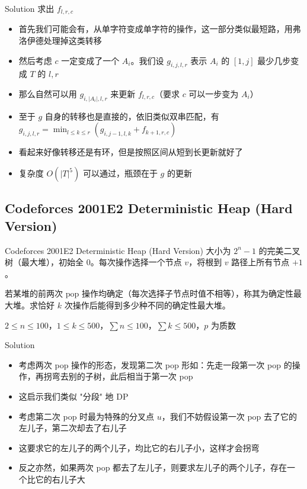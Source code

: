 ﻿\documentclass[aspectratio=169]{ctexbeamer}
\begin{document}
\begin{frame}{Solution}
    求出 $f_{l,r,c}$
    \begin{itemize}
        \item 首先我们可能会有，从单字符变成单字符的操作，这一部分类似最短路，用弗洛伊德处理掉这类转移
        \item 然后考虑 $c$ 一定变成了一个 $A_i$。我们设 $g_{i,j,l,r}$ 表示 $A_i$ 的 $[1,j]$ 最少几步变成 $T$ 的 ${l,r}$
        \item 那么自然可以用 $g_{i,|A_i|,l,r}$ 来更新 $f_{l,r,c}$（要求 $c$ 可以一步变为 $A_i$）
        \item 至于 $g$ 自身的转移也是直接的，依旧类似双串匹配，有 $g_{i,j,l,r}=\min_{l\le k\le r}(g_{i,j-1,l,k}+f_{k+1,r,c})$
        \item 看起来好像转移还是有环，但是按照区间从短到长更新就好了
        \item 复杂度 $O(|T|^5)$ 可以通过，瓶颈在于 $g$ 的更新
    \end{itemize}
\end{frame}


\subsection{Codeforces 2001E2 Deterministic Heap (Hard Version)}

\begin{frame}{Codeforces 2001E2 Deterministic Heap (Hard Version)}
      大小为 $2^n-1$ 的完美二叉树（最大堆），初始全 $0$。每次操作选择一个节点 $v$，将根到 $v$ 路径上所有节点 $+1$。
      
      若某堆的前两次 $\mathrm{pop}$ 操作均确定（每次选择子节点时值不相等），称其为确定性最大堆。求恰好 $k$ 次操作后能得到多少种不同的确定性最大堆。
      
      $2\le n\le 100$，$1\le k\le 500$，$\sum n\le 100$，$\sum k\le 500$，$p$ 为质数
\end{frame}

\begin{frame}{Solution}
    \begin{itemize}
        \item 考虑两次 pop 操作的形态，发现第二次 pop 形如：先走一段第一次 pop 的操作，再拐弯去别的子树，此后相当于第一次 pop
        \item 这启示我们类似 "分段" 地 DP
        \item 考虑第二次 pop 时最为特殊的分叉点 $u$，我们不妨假设第一次 pop 去了它的左儿子，第二次却去了右儿子
        \item 这要求它的左儿子的两个儿子，均比它的右儿子小，这样才会拐弯
        \item 反之亦然，如果两次 pop 都去了左儿子，则要求左儿子的两个儿子，存在一个比它的右儿子大
    \end{itemize}
\end{frame}
\end{document}

